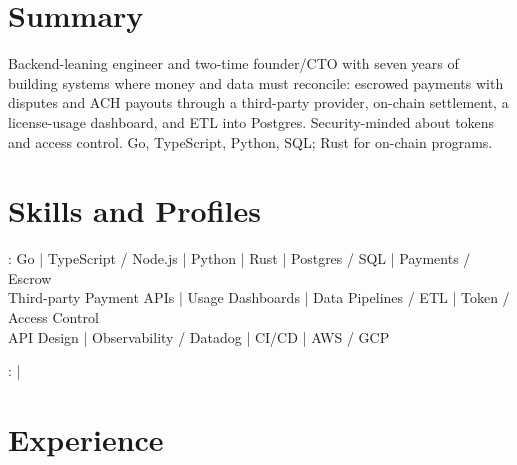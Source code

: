 \documentclass[print]{jack-resume}
\begin{document}
\pagecolor{darkmodeBackground}


\begin{minipage}[t][1cm][t]{.03\textwidth}
    \hfill
\end{minipage}

\section{Summary}
Backend-leaning engineer and two-time founder/CTO with seven years of building systems where money and data must reconcile: escrowed payments with disputes and ACH payouts through a third-party provider, on-chain settlement, a license-usage dashboard, and ETL into Postgres. Security-minded about tokens and access control. Go, TypeScript, Python, SQL; Rust for on-chain programs.
\sectionsep

\section{Skills and Profiles}
:
Go \hfill | \hfill
TypeScript / Node.js \hfill | \hfill
Python \hfill | \hfill
Rust \hfill | \hfill
Postgres / SQL \hfill | \hfill
Payments / Escrow \\
\hspace{1.0cm} Third-party Payment APIs \hfill | \hfill
Usage Dashboards \hfill | \hfill
Data Pipelines / ETL \hfill | \hfill
Token / Access Control \\
\hspace{1.0cm} API Design \hfill | \hfill
Observability / Datadog \hfill | \hfill
CI/CD \hfill | \hfill
AWS / GCP \\

\raggedright{
    :
      \href{https://www.linkedin.com/in/jack-sturtevant/}{ \ExternalLink} |
     \href{https://github.com/jacksturt}{ \ExternalLink}}

\section{Experience}
\end{document}
